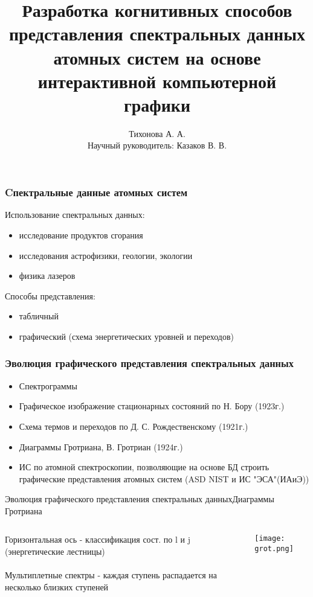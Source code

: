 \documentclass{beamer}
\title{Разработка когнитивных способов представления спектральных данных атомных систем на основе интерактивной компьютерной графики}
\author{Тихонова А. А. \\
        Научный руководитель: Казаков В. В.}
\institute{Новосибирский Государственный Университет}
\begin{document}
\begin{frame}
\titlepage
\end{frame}

\begin{frame}
\frametitle{Cпектральные данные атомных систем}
    Использование спектральных данных:
    \begin{itemize}
        \item исследование продуктов сгорания
        \item исследования астрофизики, геологии, экологии
        \item физика лазеров
    \end{itemize}
    Способы представления:
    \begin{itemize}
        \item табличный
        \item графический (схема энергетических уровней и переходов)
    \end{itemize}
\end{frame}

\begin{frame}
\frametitle{Эволюция графического представления спектральных данных}
    \begin{itemize}
        \item Спектрограммы
        \item Графическое изображение стационарных состояний по Н. Бору (1923г.)
        \item Схема термов и переходов по Д. С. Рождественскому (1921г.)
        \item Диаграммы Гротриана, В. Гротриан (1924г.)
        \item ИС по атомной спектроскопии, позволяющие на основе БД строить графические представления атомных систем (ASD NIST и ИС "ЭСА"(ИАиЭ))
    \end{itemize}
\end{frame}

\begin{frame}{Эволюция графического представления спектральных данных}{Диаграммы Гротриана}
\begin{columns}
    \begin{column}{0.5\textwidth}
    \begin{block}{}
         Горизонтальная ось - классификация сост. по l и j (энергетические лестницы)
         \\~\\Мультиплетные спектры - каждая ступень распадается на несколько близких ступеней
    \end{block}
    \end{column}
    \begin{column}{0.4\textwidth}
      \texttt{[image: grot.png]}
    \end{column}
  \end{columns}
     
  
\end{frame}
\end{document}
